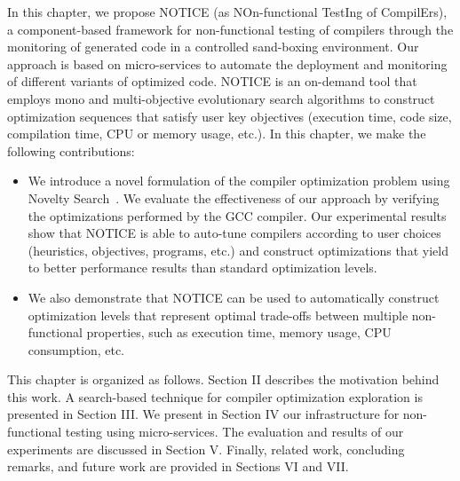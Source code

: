 In this chapter, we propose NOTICE (as NOn-functional TestIng of CompilErs), a component-based framework for non-functional testing of compilers through the monitoring of generated code in a controlled sand-boxing environment. Our approach is based on micro-services to automate the deployment and monitoring of different variants of optimized code. NOTICE is an on-demand tool that employs mono and multi-objective evolutionary search algorithms to construct optimization sequences that satisfy user key objectives (execution time, code size, compilation time, CPU or memory usage, etc.).
In this chapter, we make the following contributions:
\begin{itemize} 
	
	\item We introduce a novel formulation of the compiler optimization problem using Novelty Search~\cite{lehman2008exploiting}. We evaluate the effectiveness of our approach by verifying the optimizations performed by the GCC compiler.
	Our experimental results show that NOTICE is able to auto-tune compilers according to user choices (heuristics, objectives, programs, etc.) and construct optimizations that yield to better performance results than standard optimization levels.
	
 
	
	\item We also demonstrate that NOTICE can be used to automatically construct optimization levels that represent optimal trade-offs between multiple non-functional properties, such as execution time, memory usage, CPU consumption, etc.
\end{itemize}






This chapter is organized as follows. Section II describes the motivation behind this work. A search-based technique for compiler optimization exploration is presented in Section III. We present in Section IV our infrastructure for non-functional testing using micro-services. The evaluation and results of our experiments are discussed in Section V. Finally, related work, concluding remarks, and future work are provided in Sections VI and VII\@.


